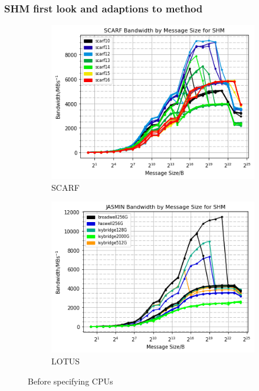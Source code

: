 \documentclass{article}
\begin{document}
        \subsubsection{SHM first look and adaptions to method}
            \label{subsubsection:SHM-first-look}
            \begin{figure}[ht]
                \centering
                \begin{subfigure}{.5\textwidth}
                  \centering
                  \includegraphics[width=\textwidth]{scarf_bandwidth-msgsize_shm}
                  \caption{SCARF}
                \end{subfigure}%
                \begin{subfigure}{.5\textwidth}
                  \centering
                  \includegraphics[width=\textwidth]{jasmin_bandwidth-msgsize_shm}
                  \caption{LOTUS}
                \end{subfigure}
            \caption{Before specifying CPUs}
            \label{figure:imb-before-cpus}
            \end{figure}
\end{document}
